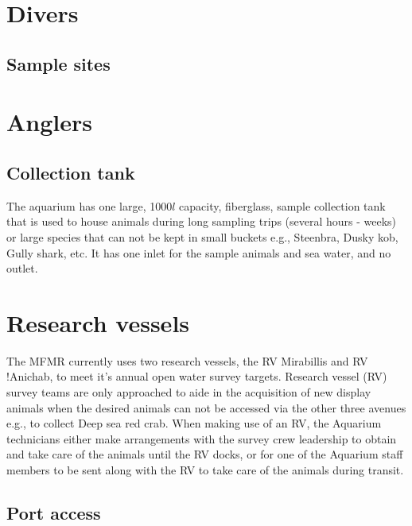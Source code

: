 \documentclass[
  12pt,
]{report}
\begin{document}
\hypertarget{divers}{%
\section{Divers}\label{divers}}

\hypertarget{sample-sites-1}{%
\subsection{Sample sites}\label{sample-sites-1}}

\hypertarget{anglers}{%
\section{Anglers}\label{anglers}}

\hypertarget{collection-tank}{%
\subsection{Collection tank}\label{collection-tank}}

The aquarium has one large, 1000\(l\) capacity, fiberglass, sample
collection tank that is used to house animals during long sampling trips
(several hours - weeks) or large species that can not be kept in small
buckets e.g., Steenbra, Dusky kob, Gully shark, etc. It has one inlet
for the sample animals and sea water, and no outlet.

\hypertarget{research-vessels}{%
\section{Research vessels}\label{research-vessels}}

The MFMR currently uses two research vessels, the RV Mirabillis and RV
!Anichab, to meet it's annual open water survey targets. Research vessel
(RV) survey teams are only approached to aide in the acquisition of new
display animals when the desired animals can not be accessed via the
other three avenues e.g., to collect Deep sea red crab. When making use
of an RV, the Aquarium technicians either make arrangements with the
survey crew leadership to obtain and take care of the animals until the
RV docks, or for one of the Aquarium staff members to be sent along with
the RV to take care of the animals during transit.

\hypertarget{port-access}{%
\subsection{Port access}\label{port-access}}
\end{document}
